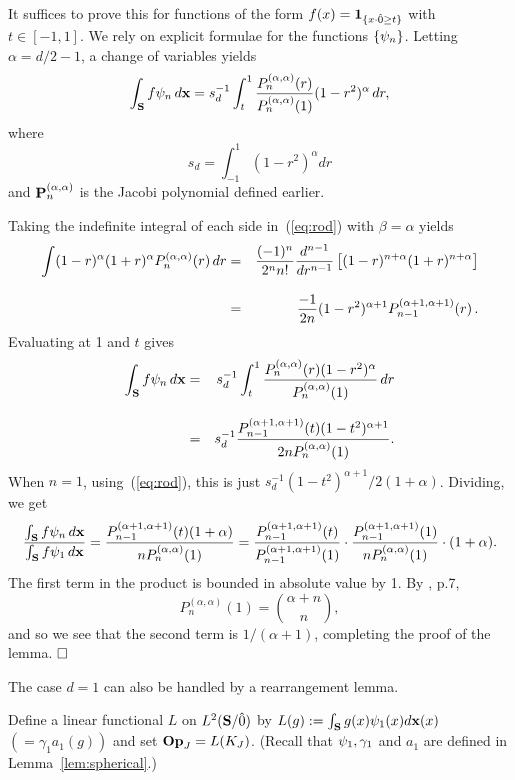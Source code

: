   It suffices to prove this for functions of the form
$f(x) = \one_{\{x \cdot \zero \geq t\}}$ with $t\in [-1,1]$.  
We rely on explicit formulae for the functions $\{ \f_n \}$. 
Letting $\alpha = d/2 - 1$, a change of variables yields
$$\int_{\S} f \f_n \, \dx 
= s_d^{-1}\int_t^1 {P_n^{(\alpha , \alpha)} (r) \over P_n^{(\alpha ,
   \alpha)} (1)} (1 - r^2)^\alpha \, dr,$$ 
where 
$$
s_d=\int_{-1}^1 (1-r^2)^\alpha dr
$$
and
$\P_n^{(\alpha , \alpha)}$ is the Jacobi polynomial defined earlier.

Taking the indefinite integral of each side in~(\ref{eq:rod})
with $\beta = \alpha$ yields
\begin{eqnarray*}
\int (1 - r)^\alpha (1 + r)^\alpha P_n^{(\alpha , \alpha)} (r) \, dr & = &
   {(-1)^n \over 2^n n!} {d^{n-1} \over dr^{n-1}} \left [ (1 - r)^{n + \alpha}
   (1 + r)^{n + \alpha} \right ] \\[2ex]
& = & {- 1 \over 2n} (1 - r^2)^{\alpha + 1} P_{n-1}^{(\alpha + 1 , 
   \alpha + 1)} (r)\, .
\end{eqnarray*}
Evaluating at 1 and $t$ gives
\begin{eqnarray*}
\int_{\S} f \f_n \, \dx 
 & = & s_d^{-1}\int_t^1 {P_n^{(\alpha , \alpha)} (r) (1 - r^2)^\alpha \over
   P_n^{(\alpha , \alpha)} (1)} \, dr \\[2ex]
& = & s_d^{-1}
{P_{n-1}^{(\alpha + 1 , \alpha + 1)} (t) (1 - t^2)^{\alpha + 1} \over
   2 n P_n^{(\alpha , \alpha)} (1)} .
\end{eqnarray*}
When $n = 1$, using~(\ref{eq:rod}),
this is just $s_d^{-1}(1 - t^2)^{\alpha + 1} / 2(1+\alpha)$.  Dividing, we get 
$${ \int_{\S} f \f_n \, \dx \over \int_{\S} f \f_1 \, \dx } 
= {P_{n-1}^{(\alpha + 1 , \alpha + 1)} (t) (1+\alpha)
   \over n P_n^{(\alpha , \alpha)} (1)} = 
   {P_{n-1}^{(\alpha + 1 , \alpha + 1)} (t) \over
   P_{n-1}^{(\alpha + 1 , \alpha + 1)} (1)} \cdot 
   {P_{n-1}^{(\alpha + 1 , \alpha + 1)} (1) \over
   n P_n^{(\alpha , \alpha)} (1)}\cdot(1+\alpha).$$
The first term in the product is bounded in absolute value by 1.  
By \cite{Askey74}, p.7,
$$P_n^{(\alpha , \alpha)} (1) = {\alpha + n \choose n} ,$$
and so we see that the second term is $1 / (\alpha + 1)$, completing the
proof of the lemma. $\qed$

The case $d = 1$ can also be handled by a rearrangement lemma.

\begin{defn} \label{defn:op}
Define a linear functional $L$ on $\ltsg$ by 
$L (g):= \int_{\S}g(x)\f_1(x) \dx(x)$ $(= \gamma_1 a_1 (g))$
and set $\op = L(K_J)$. (Recall that $\f_1,\gamma_1$ and $a_1$ are defined
in Lemma~\ref{lem:spherical}.)
\end{defn}

